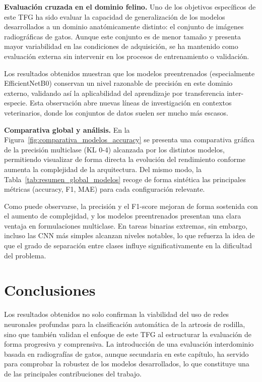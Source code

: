 \textbf{Evaluación cruzada en el dominio felino.}
Uno de los objetivos específicos de este TFG ha sido evaluar la capacidad de generalización de los modelos desarrollados a un dominio anatómicamente distinto: el conjunto de imágenes radiográficas de gatos. Aunque este conjunto es de menor tamaño y presenta mayor variabilidad en las condiciones de adquisición, se ha mantenido como evaluación externa sin intervenir en los procesos de entrenamiento o validación.

Los resultados obtenidos muestran que los modelos preentrenados (especialmente EfficientNetB0) conservan un nivel razonable de precisión en este dominio externo, validando así la aplicabilidad del aprendizaje por transferencia inter-especie. Esta observación abre nuevas líneas de investigación en contextos veterinarios, donde los conjuntos de datos suelen ser mucho más escasos.

\textbf{Comparativa global y análisis.}
En la Figura~\ref{fig:comparativa_modelos_accuracy} se presenta una comparativa gráfica de la precisión multiclase (KL 0-4) alcanzada por los distintos modelos, permitiendo visualizar de forma directa la evolución del rendimiento conforme aumenta la complejidad de la arquitectura. Del mismo modo, la Tabla~\ref{tab:resumen_global_modelos} recoge de forma sintética las principales métricas (accuracy, F1, MAE) para cada configuración relevante.


Como puede observarse, la precisión y el F1-score mejoran de forma sostenida con el aumento de complejidad, y los modelos preentrenados presentan una clara ventaja en formulaciones multiclase. En tareas binarias extremas, sin embargo, incluso las CNN más simples alcanzan niveles notables, lo que refuerza la idea de que el grado de separación entre clases influye significativamente en la dificultad del problema.

\section{Conclusiones}
Los resultados obtenidos no solo confirman la viabilidad del uso de redes neuronales profundas para la clasificación automática de la artrosis de rodilla, sino que también validan el enfoque de este TFG al estructurar la evaluación de forma progresiva y comprensiva. La introducción de una evaluación interdominio basada en radiografías de gatos, aunque secundaria en este capítulo, ha servido para comprobar la robustez de los modelos desarrollados, lo que constituye una de las principales contribuciones del trabajo.

